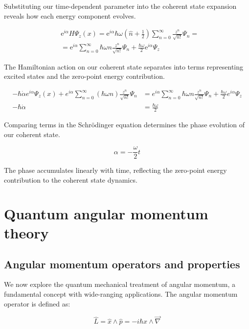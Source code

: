 \documentclass[italian]{HKNdocument}
\begin{document}
Substituting our time-dependent parameter into the coherent state expansion reveals how each energy component evolves.

\begin{align}
& \mathrm{e}^{i \alpha} H \Psi_{z}(x)=\mathrm{e}^{i \alpha} \hbar \omega\left(\hat{n}+\frac{1}{2}\right) \sum_{n=0}^{\infty} \frac{z^{n}}{\sqrt{n!}} \Psi_{n}=  \\
& =\mathrm{e}^{i \alpha} \sum_{n=0}^{\infty} \hbar \omega n \frac{z^{n}}{\sqrt{n!}} \Psi_{n}+\frac{\hbar \omega}{2} \mathrm{e}^{i \alpha} \Psi_{z}
\end{align}

The Hamiltonian action on our coherent state separates into terms representing excited states and the zero-point energy contribution.

\begin{align}
-\hbar \dot{\alpha} e^{i \alpha} \Psi_{z}(x)+e^{i \alpha} \sum_{n=0}^{\infty}(\hbar \omega n) \frac{z^{n}}{\sqrt{n!}} \Psi_{n} & =e^{i \alpha} \sum_{n=0}^{\infty} \hbar \omega n \frac{z^{n}}{\sqrt{n!}} \Psi_{n}+\frac{\hbar \omega}{2} e^{i \alpha} \Psi_{z}  \\
-\hbar \dot{\alpha} & =\frac{\hbar \omega}{2}
\end{align}

Comparing terms in the Schrödinger equation determines the phase evolution of our coherent state.

\begin{equation}
\alpha=-\frac{\omega}{2} t
\end{equation}

The phase accumulates linearly with time, reflecting the zero-point energy contribution to the coherent state dynamics.

\section{Quantum angular momentum theory}
\subsection{Angular momentum operators and properties}
We now explore the quantum mechanical treatment of angular momentum, a fundamental concept with wide-ranging applications. The angular momentum operator is defined as:

\begin{equation}
\hat{L}=\hat{x} \wedge \hat{p}=-i \hbar x \wedge \vec{\nabla}
\end{equation}
\end{document}
